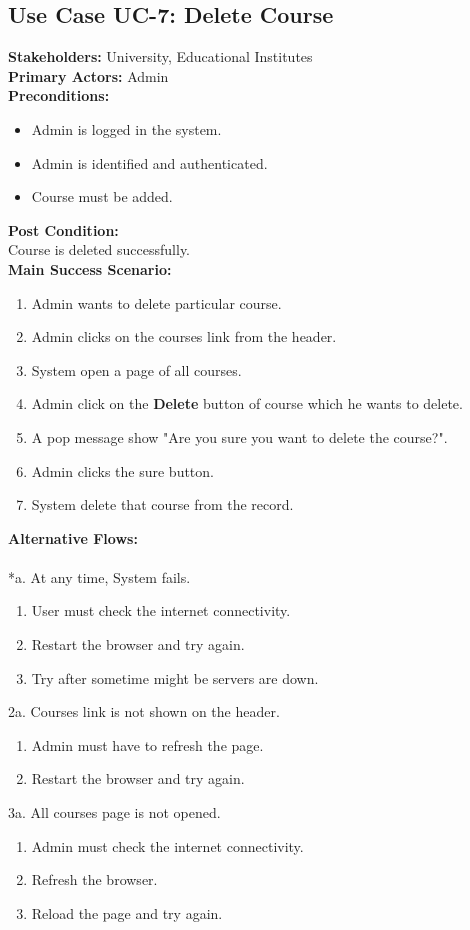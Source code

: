 \subsection{Use Case UC-7: Delete Course}
\textbf{Stakeholders: } University, Educational Institutes \\
\textbf{Primary Actors: } Admin \\
\textbf{Preconditions:}
\begin{itemize}
\item Admin is logged in the system.
\item Admin is identified and authenticated.
\item Course must be added.
\end{itemize}
\textbf{Post Condition: }\\
Course is deleted successfully.\\
\textbf{Main Success Scenario:}
\begin{enumerate}
\item Admin wants to delete particular course.
\item Admin clicks on the courses link from the header.
\item System open a page of all courses.
\item Admin click on the \textbf{Delete} button of course which he wants to delete.
\item A pop message show "Are you sure you want to delete the course?".
\item Admin clicks the sure button.
\item System delete that course from the record.
\end{enumerate}
\textbf{Alternative Flows:}\\
\\
*a. At any time, System fails.
\begin{enumerate}
\item User must check the internet connectivity.
\item Restart the browser and try again.
\item Try after sometime might be servers are down.
\end{enumerate}
2a. Courses link is not shown on the header.
\begin{enumerate}
\item Admin must have to refresh the page.
\item Restart the browser and try again.
\end{enumerate} 
3a. All courses page is not opened.
\begin{enumerate}
\item Admin must check the internet connectivity.
\item Refresh the browser.
\item Reload the page and try again.
\end{enumerate}
